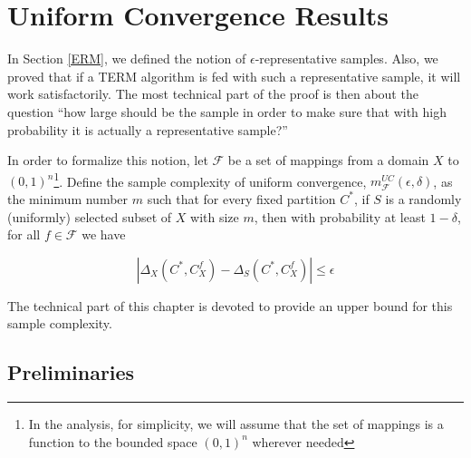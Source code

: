 \documentclass[letterpaper,12pt,titlepage,oneside,final]{book}
\begin{document}







\section{Uniform Convergence Results}

In Section \ref{ERM}, we defined the notion of $\epsilon$-representative samples. Also, we proved that if a TERM algorithm is fed with such a representative sample, it will work satisfactorily. The most technical part of the proof is then about the question ``how large should be the sample in order to make sure that with high probability it is actually a representative sample?'' 


In order to formalize this notion, let $\mathcal{F}$ be a set of mappings from a domain $X$ to $(0,1)^{n}$\footnote{In the analysis, for simplicity, we will assume that the set of mappings is a function to the bounded space ${(0,1)}^{n}$ wherever needed}. Define the sample complexity of uniform convergence, $m^{UC}_{\mathcal{F}}(\epsilon, \delta)$, as the minimum number $m$ such that for every fixed partition $C^*$, if $S$ is a randomly (uniformly) selected subset of $X$ with size $m$, then with probability at least $1-\delta$, for all $f\in \mathcal{F}$ we have

\begin{equation}
|\Delta_{X}(C^{*}, C^{f}_{X}) - \Delta_{S}(C^{*}, C^{f}_{X})| \leq \epsilon
\end{equation}

The technical part of this chapter is devoted to provide an upper bound for this sample complexity.


\subsection{Preliminaries}
\end{document}
